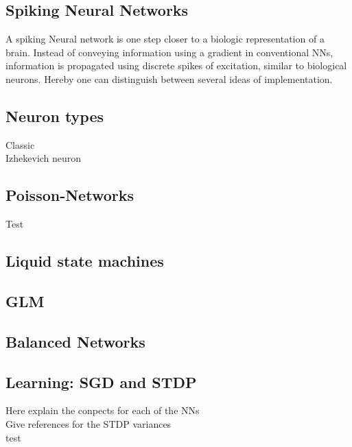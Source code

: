 \subsection{Spiking Neural Networks}
A spiking Neural network is one step closer to a biologic representation of a brain. Instead of conveying information using a gradient in conventional \ac{NN}s, information is propagated using discrete spikes of excitation, similar to biological neurons. Hereby one can distinguish between several ideas of implementation.


\subsection{Neuron types}
Classic\\
Izhekevich neuron\\

\subsection{Poisson-Networks}
Test
\subsection{Liquid state machines}

\subsection{GLM}

\subsection{Balanced Networks}

\subsection{Learning: SGD and STDP}
Here explain the conpects for each of the NNs\\
Give references for the STDP variances\\
test\\
